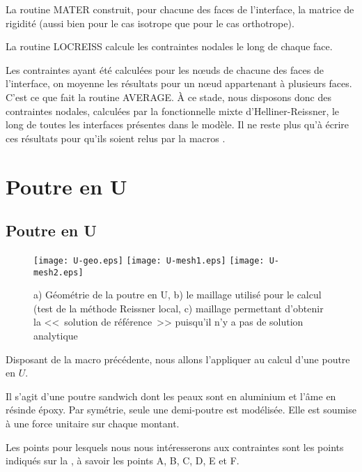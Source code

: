 \medskip
La routine MATER construit, pour chacune des faces de l'interface, la matrice de rigidité (aussi bien pour le cas isotrope
que pour le cas orthotrope).

\medskip
La routine LOCREISS calcule les contraintes nodales le long de chaque face.

\medskip
Les contraintes ayant été calculées pour les nœuds de chacune des faces de l'interface, on moyenne les résultats
pour un nœud appartenant à plusieurs faces. C'est ce que fait la routine AVERAGE. À ce stade, nous disposons donc
des contraintes nodales, calculées par la fonctionnelle mixte d'Helliner-Reissner, le long de toutes les interfaces présentes
dans le modèle. Il ne reste plus qu'à écrire ces résultats pour qu'ils soient relus par la macros \ansys.










\medskip
\ifVersionAvecExemplesSepares
   \section{Poutre en U}
\else
   \subsection{Poutre en U}
\fi

\begin{figure}[ht]
   \texttt{[image: U-geo.eps]} \hfill 
   \texttt{[image: U-mesh1.eps]}\hfill 
   \texttt{[image: U-mesh2.eps]}
   \caption{\label{Fig-poutU-geo} a) Géométrie de la poutre en U, b) le maillage utilisé pour le calcul (test de la méthode Reissner local,
c) maillage permettant d'obtenir la <<~solution de référence~>> puisqu'il n'y a pas de solution analytique}
\end{figure}

Disposant de la macro précédente, nous allons l'appliquer au calcul d'une poutre en $U$.

Il s'agit d'une poutre sandwich dont les peaux sont en aluminium et l'âme en résinde époxy.
Par symétrie, seule une demi-poutre est modélisée. Elle est soumise à une force unitaire
sur chaque montant.

\medskip
Les points pour lesquels nous nous intéresserons aux contraintes sont les points indiqués sur la
, à savoir les points A, B, C, D, E et F.



